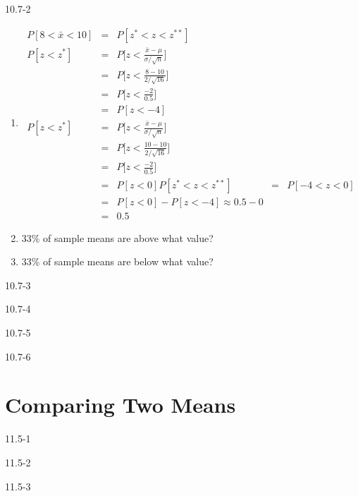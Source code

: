 \begin{exsol@solution}{10.7-2}
\begin{enumerate}
  \item
  \begin{eqnarray*}
      P[ 8 < \bar{x} < 10 ] &=& P[ z^* < z < z^{**} ] \\
       P[z < z^*] &=& P\Big[ z < \frac{ \bar{x}-\mu}{ \sigma/\sqrt{n}} \Big] \\
       &=& P\Big[ z < \frac{ 8 - 10}{ 2/\sqrt{16}} \Big] \\
       &=& P\Big[ z < \frac{-2}{0.5} \Big]   \\
        &=& P[z < -4] \\
        P[z < z^*] &=& P\Big[ z < \frac{ \bar{x}-\mu}{ \sigma/\sqrt{n}} \Big] \\
       &=& P\Big[ z < \frac{ 10 - 10}{ 2/\sqrt{16}} \Big] \\
       &=& P\Big[ z < \frac{-2}{0.5} \Big]   \\
        &=& P[z < 0]
      P[ z^* < z < z^{**} ] &=& P[ -4 < z < 0] \\
        &=&  P[ z < 0 ] - P[z < -4] \approx 0.5 - 0 \\
        &=& 0.5
  \end{eqnarray*}



  \item 33\% of sample means are above what value?
  \item 33\% of sample means are below what value?
\end{enumerate}
\end{exsol@solution}
\begin{exsol@solution}{10.7-3}
\end{exsol@solution}
\begin{exsol@solution}{10.7-4}
\end{exsol@solution}
\begin{exsol@solution}{10.7-5}
\end{exsol@solution}
\begin{exsol@solution}{10.7-6}
\end{exsol@solution}
\setcounter{chapter}{11}\chapter{Comparing Two Means}
\begin{exsol@solution}{11.5-1}

\end{exsol@solution}
\begin{exsol@solution}{11.5-2}
\end{exsol@solution}
\begin{exsol@solution}{11.5-3}
\end{exsol@solution}
